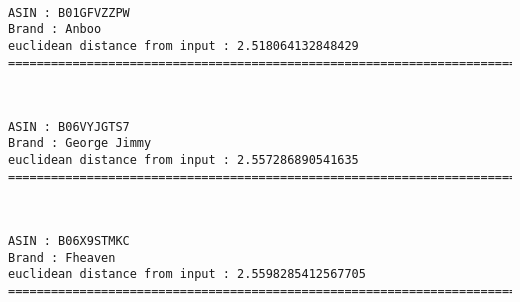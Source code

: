 \documentclass[11pt]{article}
\begin{document}
    \begin{center}
    \end{center}
    { \hspace*{\fill} \\}
    
    \begin{Verbatim}[commandchars=\\\{\}]
ASIN : B01GFVZZPW
Brand : Anboo
euclidean distance from input : 2.518064132848429
=============================================================================================================================

    \end{Verbatim}

    
    
    \begin{center}
    \end{center}
    { \hspace*{\fill} \\}
    
    \begin{Verbatim}[commandchars=\\\{\}]
ASIN : B06VYJGTS7
Brand : George Jimmy
euclidean distance from input : 2.557286890541635
=============================================================================================================================

    \end{Verbatim}

    
    
    \begin{center}
    \end{center}
    { \hspace*{\fill} \\}
    
    \begin{Verbatim}[commandchars=\\\{\}]
ASIN : B06X9STMKC
Brand : Fheaven
euclidean distance from input : 2.5598285412567705
=============================================================================================================================

    \end{Verbatim}

    
    
\end{document}
